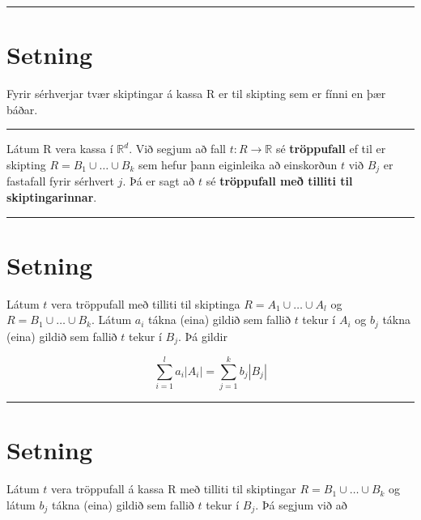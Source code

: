 \documentclass[]{book}
\begin{document}
\begin{center}\rule{0.5\linewidth}{\linethickness}\end{center}

\hypertarget{setning-13}{%
\section{Setning}\label{setning-13}}

Fyrir sérhverjar tvær skiptingar á kassa R er til skipting sem er fínni en þær báðar.

\begin{center}\rule{0.5\linewidth}{\linethickness}\end{center}

Látum R vera kassa í \(\mathbb R^d\). Við segjum að fall \(t: R \rightarrow \mathbb R\) sé \textbf{tröppufall} ef til er skipting \(R = B_1 \cup \dots \cup B_k\) sem hefur þann eiginleika að einskorðun \(t\) við \(B_j\) er fastafall fyrir sérhvert \(j\). Þá er sagt að \(t\) sé \textbf{tröppufall með tilliti til skiptingarinnar}.

\begin{center}\rule{0.5\linewidth}{\linethickness}\end{center}

\hypertarget{setning-14}{%
\section{Setning}\label{setning-14}}

Látum \(t\) vera tröppufall með tilliti til skiptinga \(R = A_1 \cup \dots \cup A_l\) og \(R = B_1 \cup \dots \cup B_k\). Látum \(a_i\) tákna (eina) gildið sem fallið \(t\) tekur í \(A_i\) og \(b_j\) tákna (eina) gildið sem fallið \(t\) tekur í \(B_j\). Þá gildir

\[
\sum_{i=1}^l a_i|A_i| = \sum_{j=1}^k b_j|B_j|
\]

\begin{center}\rule{0.5\linewidth}{\linethickness}\end{center}

\hypertarget{setning-15}{%
\section{Setning}\label{setning-15}}

Látum \(t\) vera tröppufall á kassa R með tilliti til skiptingar \(R = B_1 \cup \dots \cup B_k\) og látum \(b_j\) tákna (eina) gildið sem fallið \(t\) tekur í \(B_j\). Þá segjum við að
\end{document}
